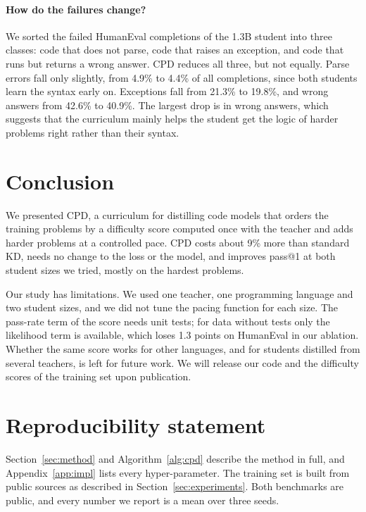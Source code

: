 \documentclass{article} %
\begin{document}
\paragraph{How do the failures change?}
We sorted the failed HumanEval completions of the 1.3B student into three classes: code that does not parse, code that raises an exception, and code that runs but returns a wrong answer.
CPD reduces all three, but not equally.
Parse errors fall only slightly, from 4.9\% to 4.4\% of all completions, since both students learn the syntax early on.
Exceptions fall from 21.3\% to 19.8\%, and wrong answers from 42.6\% to 40.9\%.
The largest drop is in wrong answers, which suggests that the curriculum mainly helps the student get the logic of harder problems right rather than their syntax.

\section{Conclusion}
\label{sec:conclusion}

We presented CPD, a curriculum for distilling code models that orders the training problems by a difficulty score computed once with the teacher and adds harder problems at a controlled pace.
CPD costs about 9\% more than standard KD, needs no change to the loss or the model, and improves pass@1 at both student sizes we tried, mostly on the hardest problems.

Our study has limitations.
We used one teacher, one programming language and two student sizes, and we did not tune the pacing function for each size.
The pass-rate term of the score needs unit tests; for data without tests only the likelihood term is available, which loses 1.3 points on HumanEval in our ablation.
Whether the same score works for other languages, and for students distilled from several teachers, is left for future work.
We will release our code and the difficulty scores of the training set upon publication.

\section*{Reproducibility statement}

Section~\ref{sec:method} and Algorithm~\ref{alg:cpd} describe the method in full, and Appendix~\ref{app:impl} lists every hyper-parameter.
The training set is built from public sources as described in Section~\ref{sec:experiments}.
Both benchmarks are public, and every number we report is a mean over three seeds.
\end{document}
